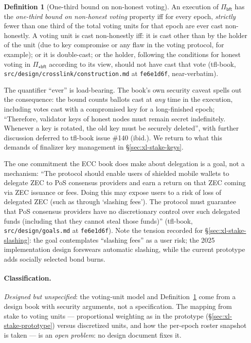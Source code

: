 \documentclass[11pt,a4paper]{article}
\theoremstyle{definition}
\newtheorem{definition}[theorem]{Definition}
\begin{document}
\begin{definition}[One-third bound on non-honest voting]
\label{def:xl-nonhonest}
An execution of $\Pi_{\mathsf{bft}}$ has the \emph{one-third bound on
non-honest voting} property iff for every epoch, \emph{strictly} fewer
than one third of the total voting units for that epoch are ever cast
non-honestly. A voting unit is cast non-honestly iff: it is cast other
than by the holder of the unit (due to key compromise or any flaw in the
voting protocol, for example); or it is double-cast; or the holder,
following the conditions for honest voting in $\Pi_{\star\mathsf{bft}}$
according to its view, should not have cast that vote (tfl-book,
\texttt{src/design/crosslink/construction.md} at \texttt{fe6e1d6f},
near-verbatim).
\end{definition}

The quantifier ``ever'' is load-bearing. The book's own security caveat
spells out the consequence: the bound counts ballots cast at \emph{any}
time in the execution, including votes cast with a compromised key for a
long-finished epoch; ``Therefore, validator keys of honest nodes must
remain secret indefinitely. Whenever a key is rotated, the old key must be
securely deleted'', with further discussion deferred to tfl-book issue
\#140 (ibid.). We return to what this demands of finalizer key management
in \S\ref{sec:xl-stake-keys}.

The one commitment the ECC book does make about delegation is a goal, not
a mechanism: ``The protocol should enable users of shielded mobile wallets
to delegate ZEC to PoS consensus providers and earn a return on that ZEC
coming via ZEC issuance or fees. Doing this may expose users to a risk of
loss of delegated ZEC (such as through `slashing fees'). The protocol must
guarantee that PoS consensus providers have no discretionary control over
such delegated funds (including that they cannot steal those funds)''
(tfl-book, \texttt{src/design/goals.md} at \texttt{fe6e1d6f}). Note the
tension recorded for \S\ref{sec:xl-stake-slashing}: the goal contemplates
``slashing fees'' as a user risk; the 2025 implementation design forswears
automatic slashing, while the current prototype adds socially selected
bond burns.

\paragraph{Classification.} \emph{Designed but unspecified}: the voting-unit
model and Definition~\ref{def:xl-nonhonest} come from a design book with
security arguments, not a specification. The mapping from stake to voting
units --- proportional weighting as in the prototype
(\S\ref{sec:xl-stake-prototype}) versus discretized units, and how the
per-epoch roster snapshot is taken --- is an \emph{open problem}: no design
document fixes it.
\end{document}
